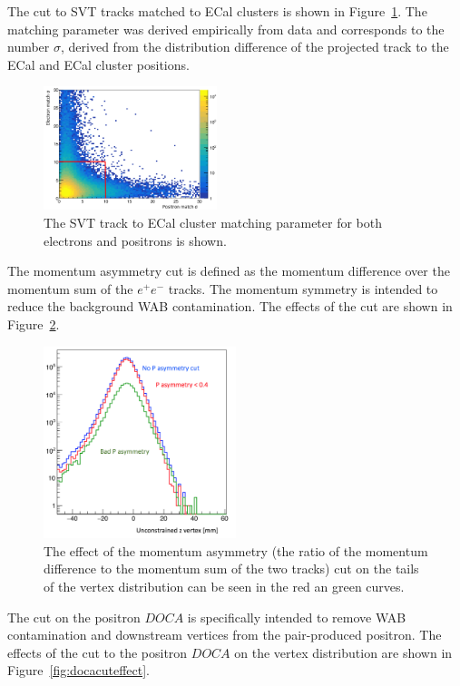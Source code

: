 The cut to SVT tracks matched to ECal clusters is shown in Figure~\ref{fig:matchcut}. The matching parameter was derived empirically from data and corresponds to the number $\sigma$, derived from the distribution difference of the projected track to the ECal and ECal cluster positions. 
\begin{figure}[H]
  \centering
      \includegraphics[width=0.45\textwidth]{pics/searching/matchcut.png}
  \caption[Cut on the track-cluster matching]{The SVT track to ECal cluster matching parameter for both electrons and positrons is shown.}
  \label{fig:matchcut}
\end{figure}
The momentum asymmetry cut is defined as the momentum difference over the momentum sum of the $e^+e^-$ tracks. The momentum symmetry is intended to reduce the background WAB contamination. The effects of the cut are shown in Figure~\ref{fig:pasycut}.
\begin{figure}[H]
  \centering
      \includegraphics[width=0.5\textwidth]{pics/searching/pasycut.png}
  \caption[Cut on the momentum asymmetry]{The effect of the momentum asymmetry (the ratio of the momentum difference to the momentum sum of the two tracks) cut on the tails of the vertex distribution can be seen in the red an green curves.}
  \label{fig:pasycut}
\end{figure} 
The cut on the positron $DOCA$ is specifically intended to remove WAB contamination and downstream vertices from the pair-produced positron. The effects of the cut to the positron $DOCA$ on the vertex distribution are shown in Figure~\ref{fig:docacuteffect}. 
